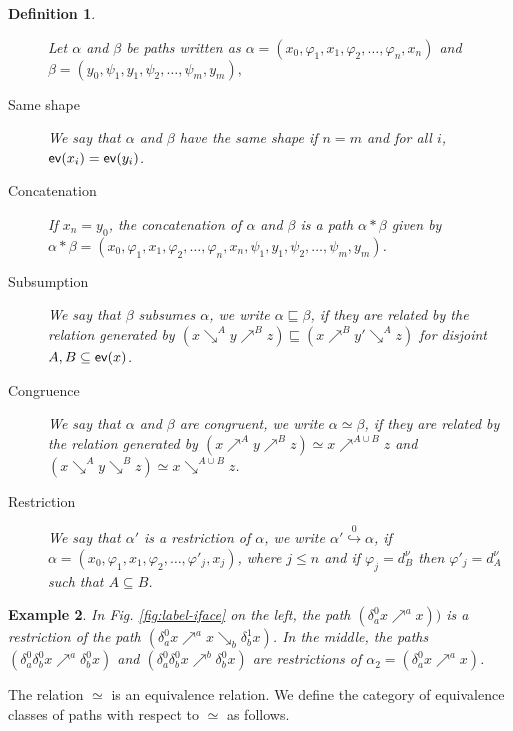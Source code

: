 \documentclass[11pt,a4paper,oldfontcommands]{memoir}
\newcommand*\ev{\textup{\textsf{ev}}}
\newcommand{\ininc}{\stackrel{0}{\hookrightarrow} }
\newtheorem{definition}{Definition}
\newtheorem{example}[definition]{Example}
\begin{document}
 \begin{definition}
     \begin{description}
     Let $\alpha$ and $\beta$ be paths written as $\alpha=\left(x_{0}, \varphi_{1}, x_{1}, \varphi_{2}, \ldots, \varphi_{n}, x_{n}\right)$ and  $\beta=\left(y_{0}, \psi_{1}, y_{1}, \psi_{2}, \ldots, \psi_{m}, y_{m}\right),$
     \item[ \hspace{0.2cm} Same shape] We say that $\alpha$ and $\beta$ have the same shape if $n=m$ and for all $i$, $\ev(x_i) =  \ev(y_i)$.
    \item[ \hspace{0.2cm} Concatenation] If $x_n=y_0$, the concatenation of $\alpha$ and $\beta$ is a path $\alpha*\beta$ given by $\alpha*\beta=\left(x_{0}, \varphi_{1}, x_{1}, \varphi_{2}, \ldots, \varphi_{n}, x_{n}, \psi_{1}, y_{1}, \psi_{2}, \ldots, \psi_{m}, y_{m} \right)$.
         \item[ \hspace{0.2cm} Subsumption] We say that $\beta$ subsumes $\alpha$, we write $\alpha \sqsubseteq \beta$, if they are related by the relation generated by $(x \searrow^A y \nearrow^B z) \sqsubseteq (x \nearrow^B y' \searrow^A z)$ for disjoint $A,B \subseteq \ev(x)$.
         \item[ \hspace{0.2cm} Congruence] We say that $\alpha$ and $\beta$ are congruent, we write $\alpha \simeq \beta$, if they are related by the relation generated by $(x \nearrow^A y \nearrow^B z) \simeq x \nearrow^{A\cup B} z$ and $(x \searrow^A y \searrow^B z) \simeq x \searrow^{A\cup B} z$.
         \item[ \hspace{0.2cm} Restriction] We say that $\alpha'$ is a restriction of $\alpha$, we write $\alpha' \ininc \alpha$, if $\alpha= \left(x_{0}, \varphi_{1}, x_{1}, \varphi_{2}, \ldots, \varphi'_{j}, x_{j}\right)$, where $j\leq n$ and if $\varphi_j=d_B^{\nu}$ then $\varphi'_j=d_A^{\nu}$ such that $A\subseteq B$.
     \end{description}
 \end{definition}
  \begin{example}
      In Fig. \ref{fig:label-iface} on the left, the path $( \delta_a^0 x \nearrow^a x))$ is a restriction of the path $( \delta_a^0 x \nearrow^a x \searrow_b \delta_b^1 x )$. In the middle, the paths $( \delta_a^0\delta_b^0 x \nearrow^a \delta_b^0 x)$ and $( \delta_a^0\delta_b^0 x \nearrow^b \delta_b^0 x)$ are restrictions of $\alpha_2 =( \delta_a^0 x \nearrow^a x)$.
  \end{example}
 The relation $\simeq$ is an equivalence relation. We define the category of equivalence classes of paths with respect to $\simeq$ as follows.
\end{document}
